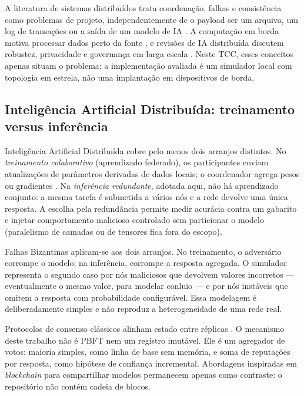 \documentclass[12pt]{article}
\begin{document}
A literatura de sistemas distribuídos trata coordenação, falhas e consistência como problemas de projeto, independentemente de o payload ser um arquivo, um log de transações ou a saída de um modelo de IA \cite{tanenbaum2017,coulouris2021}. A computação em borda motiva processar dados perto da fonte \cite{shi2016}, e revisões de IA distribuída discutem robustez, privacidade e governança em larga escala \cite{wei2025,wang2025}. Neste TCC, esses conceitos apenas situam o problema: a implementação avaliada é um simulador local com topologia em estrela, não uma implantação em dispositivos de borda.

\subsection{Inteligência Artificial Distribuída: treinamento versus inferência}

Inteligência Artificial Distribuída cobre pelo menos dois arranjos distintos. No \emph{treinamento colaborativo} (aprendizado federado), os participantes enviam atualizações de parâmetros derivadas de dados locais; o coordenador agrega pesos ou gradientes \cite{mcmahan2017,bonawitz2019,kairouz2021}. Na \emph{inferência redundante}, adotada aqui, não há aprendizado conjunto: a mesma tarefa é submetida a vários nós e a rede devolve uma única resposta. A escolha pela redundância permite medir acurácia contra um gabarito e injetar comportamento malicioso controlado sem particionar o modelo (paralelismo de camadas ou de tensores fica fora do escopo).

Falhas Bizantinas \cite{lamport1982,castro1999} aplicam-se aos dois arranjos. No treinamento, o adversário corrompe o modelo; na inferência, corrompe a resposta agregada. O simulador representa o segundo caso por nós maliciosos que devolvem valores incorretos --- eventualmente o mesmo valor, para modelar conluio --- e por nós instáveis que omitem a resposta com probabilidade configurável. Essa modelagem é deliberadamente simples e não reproduz a heterogeneidade de uma rede real.

Protocolos de consenso clássicos alinham estado entre réplicas \cite{tanenbaum2017}. O mecanismo deste trabalho não é PBFT nem um registro imutável. Ele é um agregador de votos: maioria simples, como linha de base sem memória, e soma de reputações por resposta, como hipótese de confiança incremental. Abordagens inspiradas em \textit{blockchain} para compartilhar modelos \cite{blockchainAI2024,chen2024} permanecem apenas como contraste: o repositório não contém cadeia de blocos.
\end{document}
